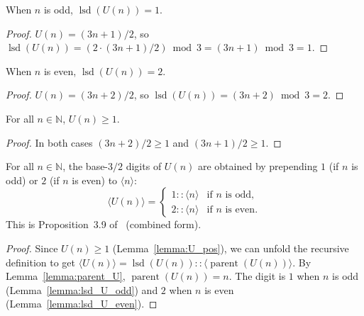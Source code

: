 \begin{lemma}\label{lemma:lsd_U_odd}\leanok
When $n$ is odd, $\operatorname{lsd}(U(n)) = 1$.
\end{lemma}
\begin{proof}\leanok
$U(n) = (3n+1)/2$, so $\operatorname{lsd}(U(n)) = (2 \cdot (3n+1)/2) \bmod 3 = (3n+1) \bmod 3 = 1$.
\end{proof}

\begin{lemma}\label{lemma:lsd_U_even}\leanok
When $n$ is even, $\operatorname{lsd}(U(n)) = 2$.
\end{lemma}
\begin{proof}\leanok
$U(n) = (3n+2)/2$, so $\operatorname{lsd}(U(n)) = (3n+2) \bmod 3 = 2$.
\end{proof}

\begin{lemma}\label{lemma:U_pos}\leanok
For all $n \in \mathbb{N}$, $U(n) \ge 1$.
\end{lemma}
\begin{proof}\leanok
In both cases $(3n+2)/2 \ge 1$ and $(3n+1)/2 \ge 1$.
\end{proof}

\begin{lemma}\label{lemma:digits32_U}\leanok
For all $n \in \mathbb{N}$, the base-$3/2$ digits of $U(n)$ are obtained by prepending
$1$ (if $n$ is odd) or $2$ (if $n$ is even) to $\langle n \rangle$:
\[
  \langle U(n) \rangle =
  \begin{cases}
    1 :: \langle n \rangle & \text{if } n \text{ is odd}, \\
    2 :: \langle n \rangle & \text{if } n \text{ is even}.
  \end{cases}
\]
This is Proposition~3.9 of~\cite{eli25} (combined form).
\end{lemma}
\begin{proof}\leanok
Since $U(n) \ge 1$ (Lemma~\ref{lemma:U_pos}), we can unfold the recursive definition
to get $\langle U(n) \rangle = \operatorname{lsd}(U(n)) :: \langle \operatorname{parent}(U(n)) \rangle$.
By Lemma~\ref{lemma:parent_U}, $\operatorname{parent}(U(n)) = n$.
The digit is $1$ when $n$ is odd (Lemma~\ref{lemma:lsd_U_odd})
and $2$ when $n$ is even (Lemma~\ref{lemma:lsd_U_even}).
\end{proof}

